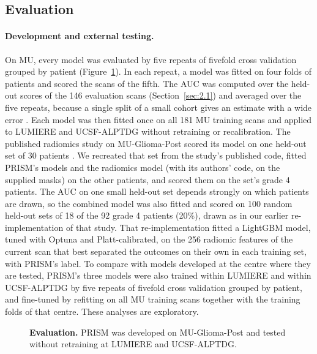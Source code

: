 \documentclass[largeformat]{interact} %
\begin{document}
\subsection{Evaluation}\label{sec:2.3}

\paragraph*{Development and external testing.} On MU, every model was evaluated by five repeats of fivefold cross
validation grouped by patient (Figure~\ref{fig:evaluation}). In each repeat, a model was fitted on four folds of patients and scored the scans of the
fifth. The AUC was computed over the held-out scores of the 146 evaluation scans (Section~\ref{sec:2.1}) and averaged
over the five repeats, because a single split of a small cohort gives an estimate with a wide error
\citep{an2021,varoquaux2018}. Each model was then fitted once on all 181 MU training scans and applied to LUMIERE and
UCSF-ALPTDG without retraining or recalibration. The published radiomics study on MU-Glioma-Post scored its model on one held-out set of 30 patients
\citep{christodoulou2026,christodoulou2026code}. We recreated that set from the study's published code, fitted PRISM's
models and the radiomics model (with its authors' code, on the supplied masks) on the other patients, and scored them
on the set's grade 4 patients. The AUC on one small held-out set depends strongly on which patients are drawn, so the
combined model was also fitted and scored on 100 random held-out sets of 18 of the 92 grade 4 patients (20\%), drawn
as in our earlier re-implementation of that study. That re-implementation fitted a LightGBM model, tuned with Optuna
and Platt-calibrated, on the 256 radiomic features of the current scan that best separated the outcomes on their own in each training set, with PRISM's label. To compare with models developed at the centre where they are tested, PRISM's three models
were also trained within LUMIERE and within UCSF-ALPTDG by five repeats of fivefold cross validation grouped by
patient, and fine-tuned by refitting on all MU training scans together with the training folds of that centre. These
analyses are exploratory.

\begin{figure}[!htbp]
\centering
{}
\vspace{-2mm}
\caption{\textbf{Evaluation.} PRISM was developed on MU-Glioma-Post and tested without retraining at LUMIERE and
UCSF-ALPTDG.}
\label{fig:evaluation}
\end{figure}
\end{document}
